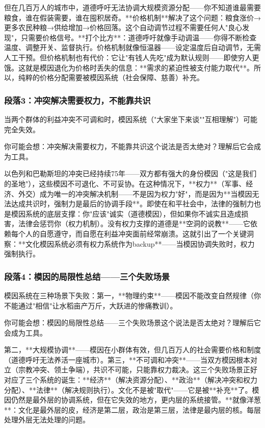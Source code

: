 \documentclass[openany, a4paper, 12pt]{book}
\newenvironment{motivation}{
	\vspace{0.5em}
	\begin{tcolorbox}[
		colback=gray!10,           %
		colframe=gray!60,          %
		title=\textit{本章动机 (Motivation)},
		fonttitle=\bfseries,
		arc=0mm,                   %
		leftrule=3mm               %
		]
		\small \itshape %
	}{
	\end{tcolorbox}
	\vspace{1em}
}
\begin{document}
\begin{motivation}
\begin{motivation}
\begin{motivation}
但在几百万人的城市中，道德呼吁无法协调大规模资源分配——你不知道谁最需要粮食，谁在假装需要，谁在囤积居奇。**价格机制**解决了这个问题：粮食涨价→更多农民种粮→供给增加→价格回落。这个自动调节过程不需要任何人"良心发现"，只需要价格信号。**打个比方**：道德呼吁就像手动调温——你得不断检查温度、调整开关、监督执行。价格机制就像恒温器——设定温度后自动调节，无需人工干预。但价格机制也有代价：它让"有钱人先吃"成为默认规则——即使穷人更饿。这就是模因退化为价格时丢失的信息：**需求的紧迫性被支付能力取代**。所以，纯粹的价格分配需要被模因系统（社会保障、慈善）补充。

	\subsubsection*{段落3：冲突解决需要权力，不能靠共识}
	当两个群体的利益冲突不可调和时，模因系统（"大家坐下来谈""互相理解"）可能完全失效。
	\begin{tcolorbox}[colback=yellow!5, title=\textit{读者行为预测}]
		你可能会想：冲突解决需要权力，不能靠共识这个说法是否太绝对？理解后它会成为工具。
	\end{tcolorbox}

以色列和巴勒斯坦的冲突已经持续75年——双方都有强大的身份模因（"这是我们的圣地"），这些模因不可退化、不可妥协。在这种情况下，**权力**（军事、经济、外交）成为唯一的冲突解决机制——不是因为权力"好"，而是因为**当模因无法达成共识时，强制力是最后的协调手段**。即使在和平社会中，法律的强制力也是模因系统的底层支撑：你"应该"诚实（道德模因），但如果你不诚实且造成损害，法律会惩罚你（权力机制）。没有权力支撑的道德是**空洞的说教**——它依赖每个人的自愿遵守，而自愿在利益冲突面前经常崩溃。这就引出了一个关键洞察：**文化模因系统必须有权力系统作为backup**——当模因协调失败时，权力强制执行。

	\subsubsection*{段落4：模因的局限性总结——三个失败场景}
	模因系统在三种场景下失败：第一，**物理约束**——模因不能改变自然规律（你不能通过"相信"让水稻亩产万斤，大跃进的惨痛教训）。
	\begin{tcolorbox}[colback=yellow!5, title=\textit{读者行为预测}]
		你可能会想：模因的局限性总结——三个失败场景这个说法是否太绝对？理解后它会成为工具。
	\end{tcolorbox}

第二，**大规模协调**——模因在小群体有效，但几百万人的社会需要价格和制度（道德呼吁无法养活一座城市）。第三，**不可调和冲突**——当双方模因根本对立（宗教冲突、领土争端），共识不可能，只能靠权力裁决。这三个失败场景正好对应了三个系统的诞生：**经济**（解决资源分配）、**政治**（解决冲突和权力分配）、**法律**（解决规则执行）。文化不是被"取代"——它是被**补充**了。模因仍然是最外层的协调系统，但在它失效的地方，更内层的系统接管。**就像洋葱**：文化是最外层的皮，经济是第二层，政治是第三层，法律是最内层的核。每层处理外层无法处理的问题。


\end{motivation}
\end{motivation}
\end{motivation}
\end{document}
